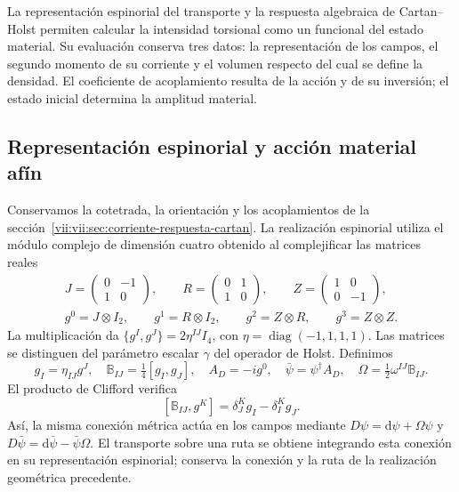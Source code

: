 La representación espinorial del transporte y la respuesta algebraica
de Cartan--Holst permiten calcular la intensidad torsional como un
funcional del estado material. Su evaluación conserva tres datos:
la representación de los campos, el segundo momento de su corriente y
el volumen respecto del cual se define la densidad. El coeficiente de
acoplamiento resulta de la acción y de su inversión; el estado inicial
determina la amplitud material.

\subsection{Representación espinorial y acción material afín}
\label{vii:vii:subsec:accion-espinorial-afin}

Conservamos la cotetrada, la orientación y los acoplamientos de la
sección~\ref{vii:vii:sec:corriente-respuesta-cartan}. La realización
espinorial utiliza el módulo complejo de dimensión cuatro obtenido al
complejificar las matrices reales
\begin{equation}
 \begin{gathered}
 J=\begin{pmatrix}0&-1\\1&0\end{pmatrix},\qquad
 R=\begin{pmatrix}0&1\\1&0\end{pmatrix},\qquad
 Z=\begin{pmatrix}1&0\\0&-1\end{pmatrix},\\
 g^0=J\otimes I_2,\qquad g^1=R\otimes I_2,\qquad
 g^2=Z\otimes R,\qquad g^3=Z\otimes Z.
 \end{gathered}
 \label{vii:vii:eq:clifford-material-explicito}
\end{equation}
La multiplicación da
\(\{g^I,g^J\}=2\eta^{IJ}I_4\), con
\(\eta=\operatorname{diag}(-1,1,1,1)\). Las matrices se distinguen
del parámetro escalar \(\gamma\) del operador de Holst. Definimos
\begin{equation}
 g_I=\eta_{IJ}g^J,\quad
 \mathbb B_{IJ}=\tfrac14[g_I,g_J],\quad
 A_D=-i g^0,\quad \bar\psi=\psi^\dagger A_D,\quad
 \Omega=\tfrac12\omega^{IJ}\mathbb B_{IJ}.
 \label{vii:vii:eq:adjunto-conexion-espinorial}
\end{equation}
El producto de Clifford verifica
\[
 [\mathbb B_{IJ},g^K]=\delta_J^K g_I-\delta_I^K g_J.
\]
Así, la misma conexión métrica actúa en los campos mediante
\(D\psi=\mathrm d\psi+\Omega\psi\) y
\(D\bar\psi=\mathrm d\bar\psi-\bar\psi\Omega\).
El transporte sobre una ruta se obtiene integrando esta conexión en
su representación espinorial; conserva la conexión y la ruta de la
realización geométrica precedente.

